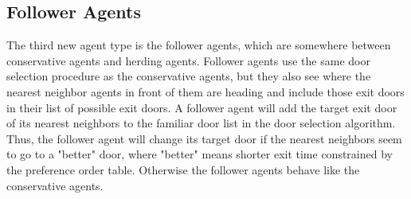 \documentclass[12pt,a4paper,final,twoside]{stylevk}
\begin{document}
\subsection{Follower Agents}\label{Sec_FollowerAgents}

\noindent The third new agent type is the follower agents, which are
somewhere between conservative agents and herding agents.  Follower
agents use the same door selection procedure as the conservative
agents, but they also see where the nearest neighbor agents in front
of them are heading and include those exit doors in their list of
possible exit doors.  A follower agent will add the target exit door
of its nearest neighbors to the familiar door list in the door
selection algorithm.  Thus, the follower agent will change its target
door if the nearest neighbors seem to go to a "better" door, where
"better" means shorter exit time constrained by the preference order
table.  Otherwise the follower agents behave like the conservative
agents.




\end{document}
